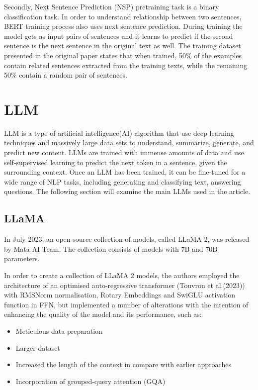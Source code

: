 \documentclass[PMI,VKR]{HSEUniversity}
\begin{document}
Secondly, Next Sentence Prediction (NSP) pretraining task is a binary classification task. 
In order to understand relationship between two sentences, BERT training process also uses next sentence prediction.
During training the model gets as input pairs of sentences and it learns to predict if the second sentence is the next sentence in the original text as well. 
The training dataset presented in the original paper states that when trained, 50\% of the examples contain related sentences extracted from the training texts, while the remaining 50\% contain a random pair of sentences.


\section{LLM}

LLM is a type of artificial intelligence(AI) algorithm that use deep learning techniques and massively large data sets to understand, summarize, generate, and predict new content. 
LLMs are trained with immense amounts of data and use self-supervised learning to predict the next token in a sentence, given the surrounding context. 
Once an LLM has been trained, it can be fine-tuned for a wide range of NLP tasks, including generating and classifying text, answering questions.
The following section will examine the main LLMs used in the article.

\subsection{LLaMA}

In July 2023, an open-source collection of models, called LLaMA 2, was released by Mata AI Team. The collection consists of models with 7B and 70B parameters.

In order to create a collection of LLaMA 2 models, the authors employed the architecture of an optimised auto-regressive transformer (Touvron et al.(2023)) with RMSNorm normalisation, Rotary Embeddings and SwiGLU activation function in FFN, but implemented a number of alterations with the intention of enhancing the quality of the model and its performance, such as:
\begin{itemize}
    \item Meticulous data preparation
    \item Larger dataset
    \item Increased the length of the context in compare with earlier approaches
    \item Incorporation of grouped-query attention (GQA)
\end{itemize}   
\end{document}
